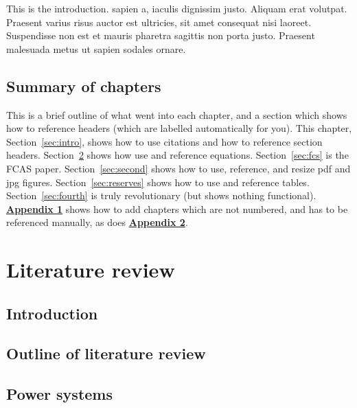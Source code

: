 \documentclass[12pt,a4paper,]{report}
\begin{document}
This is the introduction. sapien a, iaculis dignissim justo. Aliquam
erat volutpat. Praesent varius risus auctor est ultricies, sit amet
consequat nisi laoreet. Suspendisse non est et mauris pharetra sagittis
non porta justo. Praesent malesuada metus ut sapien sodales ornare.

\hypertarget{summary-of-chapters}{%
\section{Summary of chapters}\label{summary-of-chapters}}

This is a brief outline of what went into each chapter, and a section
which shows how to reference headers (which are labelled automatically
for you). This chapter, Section~\ref{sec:intro}, shows how to use
citations and how to reference section headers.
Section~\ref{sec:lit_review} shows how use and reference equations.
Section~\ref{sec:fcs} is the FCAS paper. Section~\ref{sec:second} shows
how to use, reference, and resize pdf and jpg figures.
Section~\ref{sec:reserves} shows how to use and reference tables.
Section~\ref{sec:fourth} is truly revolutionary (but shows nothing
functional).
\textbf{\protect\hyperlink{appendix-1-some-extra-stuff}{Appendix 1}}
shows how to add chapters which are not numbered, and has to be
referenced manually, as does
\textbf{\protect\hyperlink{appendix-2-some-more-extra-stuff}{Appendix
2}}.

\hypertarget{sec:lit_review}{%
\chapter{Literature review}\label{sec:lit_review}}

\hypertarget{introduction}{%
\section{Introduction}\label{introduction}}

\hypertarget{outline-of-literature-review}{%
\section{Outline of literature
review}\label{outline-of-literature-review}}

\hypertarget{sec:lit_review-power_systems}{%
\section{Power systems}\label{sec:lit_review-power_systems}}
\end{document}
